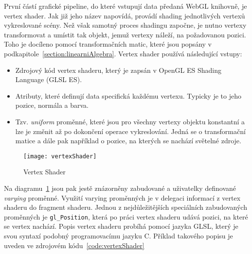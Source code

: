 První částí grafické pipeline, do které vstupují data předaná WebGL knihovně, je vertex shader. Jak již jeho název napovídá, provádí shading jednotlivých vertexů vykreslované scény. Než však samotný proces shadingu započne, je nutno vertexy transformovat a umístit tak objekt, jemuž vertexy náleží, na požadovanou pozici. Toho je docíleno pomocí transformačních matic, které jsou popsány v podkapitole~\ref{section:linearniAlgebra}. Vertex shader používá následující vstupy:
\begin{itemize}
\item Zdrojový kód vertex shaderu, který je zapsán v OpenGL ES Shading Language (GLSL ES).
\item Atributy, které definují data specifická každému vertexu. Typicky je to jeho pozice, normála a barva.
\item Tzv. \textit{uniform} proměnné, které jsou pro všechny vertexy objektu konstantní a lze je změnit až po dokončení operace vykreslování. Jedná se o transformační matice a dále pak například o pozice, na kterých se nachází světelné zdroje.
\end{itemize}

\begin{figure}[htb]
\centering
\texttt{[image: vertexShader]}
\caption{Vertex Shader}
\label{fig:vertexShader}
\end{figure}

Na diagramu~\ref{fig:vertexShader} jsou pak jestě znázorněny zabudované a uživatelky definované \textit{varying} proměnné. Využití varying proměnných je v delegaci informací z vertex shaderu do fragment shaderu. Jednou z nejdůležitějších speciálních zabudovaných proměnných je \texttt{gl\_Position}, která po práci vertex shaderu udává pozici, na které se vertex nachází. Popis vertex shaderu probíhá pomocí jazyka GLSL, který je svou syntaxí podobný programovacímu jazyku C. Příklad takového popisu je uveden ve zdrojovém kódu~\ref{code:vertexShader}

